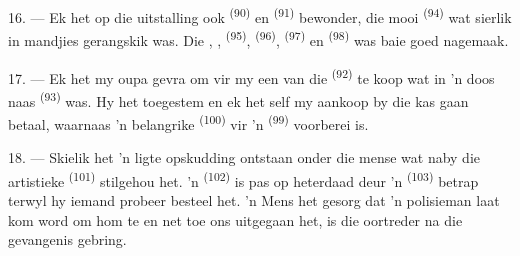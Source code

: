 16. --- Ek het op die uitstalling ook  \textsuperscript{(90)} en
 \textsuperscript{(91)} bewonder, die mooi 
\textsuperscript{(94)} wat sierlik in mandjies gerangskik was. Die ,
,  \textsuperscript{(95)}, 
\textsuperscript{(96)},  \textsuperscript{(97)} en 
\textsuperscript{(98)} was baie goed nagemaak.

\VUsaut{4.4mm}
\VUsaut{2.8mm}

17. --- Ek het my oupa gevra om vir my een van die 
\textsuperscript{(92)} te koop wat in 'n doos naas 
\textsuperscript{(93)} was. Hy het toegestem en ek het self my aankoop by die kas gaan
betaal, waarnaas 'n belangrike  \textsuperscript{(100)} vir 'n
 \textsuperscript{(99)} voorberei is.

18. --- Skielik het 'n ligte opskudding ontstaan onder die mense wat naby die artistieke
 \textsuperscript{(101)} stilgehou het. 'n 
\textsuperscript{(102)} is pas op heterdaad deur 'n 
\textsuperscript{(103)} betrap terwyl hy iemand probeer besteel het. 'n Mens het gesorg
dat 'n polisieman laat kom word om hom te  en net toe ons uitgegaan
het, is die oortreder na die gevangenis gebring.
\VUsaut{6.0mm}
\VUfilet{22mm}
